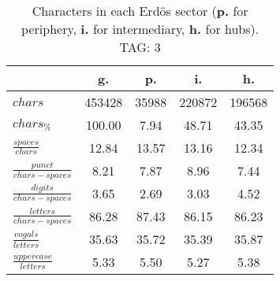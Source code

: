 \begin{table}[h!]
\begin{center}
\begin{tabular}{| l | c | c | c | c |}\hline
 & g. & p. & i. & h. \\\hline
$chars$ & 453428  & 35988  & 220872  & 196568 \\\hline
$chars_{\%}$ & 100.00  & 7.94  & 48.71  & 43.35 \\\hline
$\frac{spaces}{chars}$ & 12.84  & 13.57  & 13.16  & 12.34 \\\hline
$\frac{punct}{chars-spaces}$ & 8.21  & 7.87  & 8.96  & 7.44 \\\hline
$\frac{digits}{chars-spaces}$ & 3.65  & 2.69  & 3.03  & 4.52 \\\hline
$\frac{letters}{chars-spaces}$ & 86.28  & 87.43  & 86.15  & 86.23 \\\hline
$\frac{vogals}{letters}$ & 35.63  & 35.72  & 35.39  & 35.87 \\\hline
$\frac{uppercase}{letters}$ & 5.33  & 5.50  & 5.27  & 5.38 \\\hline
\end{tabular}
\caption{Characters in each Erd\"os sector ({{\bf p.}} for periphery, {{\bf i.}} for intermediary, 
    {{\bf h.}} for hubs). TAG: 3}
\end{center}
\end{table}